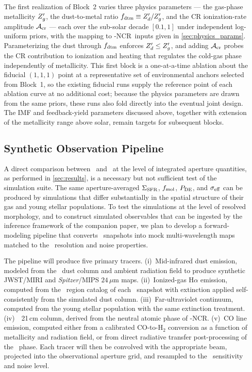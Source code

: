 The first realization of Block~2 varies three physics parameters --- the
gas-phase metallicity $Z_g'$, the dust-to-metal ratio $f_{\rm dtm} \equiv Z_d'/Z_g'$,
and the CR ionization-rate amplitude $\mathcal{A}_{\rm cr}$ --- each over the sub-solar
decade $[0.1, 1]$ under independent log-uniform priors, with the mapping to
\TIGRESS-NCR\ inputs given in \autoref{sec:physics_params}. Parameterizing the
dust through $f_{\rm dtm}$ enforces $Z_d' \le Z_g'$, and adding $\mathcal{A}_{\rm cr}$ probes the CR
contribution to ionization and heating that regulates the cold-gas phase
independently of metallicity. This first block is a one-at-a-time ablation about
the fiducial $(1,1,1)$ point at a representative set of environmental anchors
selected from Block~1, so the existing fiducial runs supply the reference point
of each ablation curve at no additional cost; because the physics parameters are
drawn from the same priors, these runs also fold directly into the eventual
joint design. The IMF and feedback-yield parameters discussed above, together
with extension of the metallicity range above solar, remain targets for
subsequent blocks.

\subsection{Synthetic Observation Pipeline}
\label{sec:disc_synth}

A direct comparison between \TIGRESS\ and \PHANGS\ at the level of
integrated aperture quantities, as performed in
\autoref{sec:results}, is a necessary but not sufficient test of the
simulation suite. The same aperture-averaged $\Sigma_{\rm SFR}$, $f_{\rm mol}$, $P_{\rm DE}$,
and $\sigma_{\rm eff}$ can be produced by simulations that differ substantially in
the spatial structure of their gas and young stellar populations. To
test the simulations at the level of resolved morphology, and to
construct simulated observables that can be ingested by the inference
framework of the companion paper, we plan to develop a forward-modeling
pipeline that converts \TIGRESS\ snapshots into mock multi-wavelength
maps matched to the \PHANGS\ resolution and noise properties.

The pipeline will produce five primary tracers. (i)~Mid-infrared dust
emission, modeled from the \TIGRESS\ dust column and ambient radiation
field to produce synthetic JWST/MIRI and \emph{Spitzer}/MIPS $24\,\mu$m
maps. (ii)~Ionized-gas H$\alpha$ emission, computed from the \HII\
region catalog of each \TIGRESS\ snapshot with extinction applied
self-consistently from the simulated dust column. (iii)~Far-ultraviolet
continuum, computed from the young stellar population with the same
extinction treatment. (iv)~\HI\ 21\,cm column, derived from the neutral
atomic phase of \TIGRESS-NCR. (v)~CO line emission, computed either
from a calibrated CO-to-H$_2$ conversion as a function of metallicity
and radiation field, or from direct radiative transfer post-processing
of the \HH\ phase. 
Each tracer will then be convolved with the appropriate beam, projected
into the observational aperture grid, and resampled to the \PHANGS\
sensitivity and noise level.

